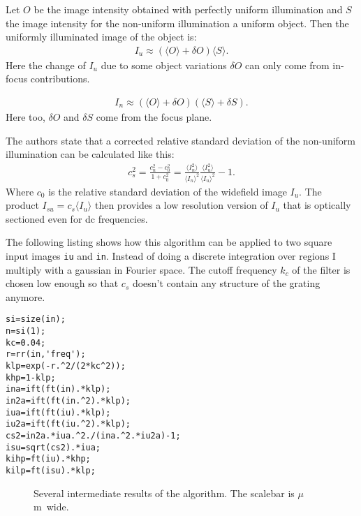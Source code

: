 \documentclass[11pt]{scrartcl}
\newcommand{\avg}[1]{\langle #1 \rangle}
\begin{document}
Let $O$ be the image intensity obtained with perfectly uniform
illumination and $S$ the image intensity for the non-uniform
illumination a uniform object. Then the uniformly illuminated image of
the object is:
\begin{align}
  I_u\approx (\avg{O}+\delta O)\avg{S}.
\end{align}
Here the change of $I_u$ due to some object variations $\delta O$ can
only come from in-focus contributions.

\begin{align}
\label{in}
  I_n\approx (\avg{O}+\delta O)(\avg{S}+\delta S).
\end{align}
Here too, $\delta O$ and $\delta S$ come from the focus plane.

The authors state that a corrected relative standard deviation
of the non-uniform illumination can be calculated like this:
\begin{align} 
  c_s^2=\frac{c_n^2-c_0^2}{1+c_0^2}
  =
  \frac{\avg{I_n^2}}{\avg{I_n}^2}
  \frac{\avg{I_u^2}}{\avg{I_u}^2}-1.
\end{align}
Where $c_0$ is the relative standard deviation of the widefield image
$I_u$. The product $I_{su}=c_s\avg{I_u}$ then provides a low
resolution version of $I_u$ that is optically sectioned even for dc
frequencies.

The following listing shows how this algorithm can be applied to two
square input images {\tt iu} and {\tt in}. Instead of doing a discrete
integration over regions I multiply with a gaussian in Fourier
space. The cutoff frequency $k_c$ of the filter is chosen low enough
so that $c_s$ doesn't contain any structure of the grating anymore.
\begin{lstlisting}
si=size(in);
n=si(1);
kc=0.04;
r=rr(in,'freq');
klp=exp(-r.^2/(2*kc^2));
khp=1-klp;
ina=ift(ft(in).*klp);
in2a=ift(ft(in.^2).*klp);
iua=ift(ft(iu).*klp);
iu2a=ift(ft(iu.^2).*klp);
cs2=in2a.*iua.^2./(ina.^2.*iu2a)-1;
isu=sqrt(cs2).*iua;
kihp=ft(iu).*khp;
kilp=ft(isu).*klp;
\end{lstlisting}

\begin{figure}[htb]
  \centering
  \caption{Several intermediate results of the algorithm. The scalebar is
    \unit[2]{$\mu$m} wide.}
  \label{fig:hilo1interm}
\end{figure}
\end{document}
